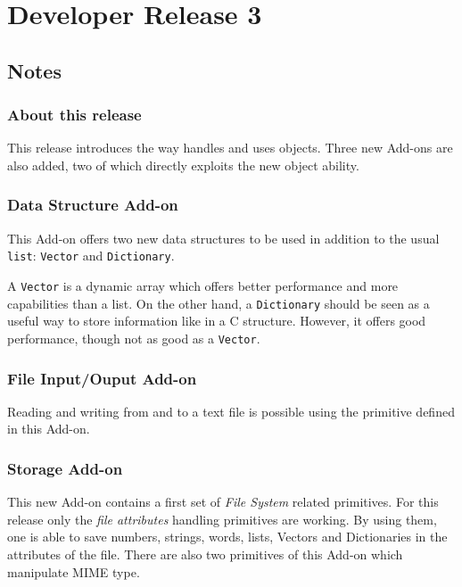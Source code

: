\section{Developer Release 3}

\subsection{Notes}

\subsubsection{About this release}

This release introduces the way \squirrel handles and uses objects.  Three new Add-ons are also added, two of which directly exploits the new object ability.

\subsubsection{Data Structure Add-on}

This Add-on offers two new data structures to be used in addition to the usual {\tt list}: {\tt Vector} and {\tt Dictionary}. 

A {\tt Vector} is a dynamic array which offers better performance and more capabilities than a list.  On the other hand, a {\tt Dictionary} should be seen as a useful way to store information like in a C structure.  However, it offers good performance, though not as good as a {\tt Vector}.

\subsubsection{File Input/Ouput Add-on}

Reading and writing from and to a text file is possible using the primitive defined in this Add-on.

\subsubsection{Storage Add-on}

This new Add-on contains a first set of {\em File System} related primitives. For this release
only the {\em file attributes} handling primitives are working. By using them, one is able to save numbers, strings, words, lists, Vectors and Dictionaries in the attributes of the file. There are also two primitives of this Add-on which manipulate MIME type.

